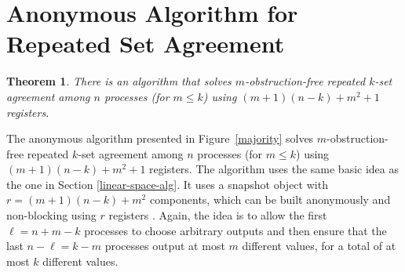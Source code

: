 \documentclass[11pt]{article}
\newtheorem{theorem}{Theorem}
\newtheorem{proposition}[theorem]{Proposition}
\newcommand{\ceil}[1]{\left\lceil #1 \right\rceil}
\newcommand{\ignore}[1]{}
\begin{document}
\ignore{
In the special case where $m=k-1$, the arithmetic in the proof of Theorem \ref{m-conc-lower-thm} can be done more carefully to get a tighter bound, as described in the following proposition, which will be used in Section \ref{resilient-lower}.

\begin{proposition}
Any anonymous algorithm that solves $(k-1)$-obstruction-free $k$-set agreement among $n$ processes using registers must use more than $\sqrt{2(n-k+1)}$ registers.
\end{proposition}
\begin{proof}
Let $m=k-1$.
Assume an algorithm solves the problem using $r$ registers where $r\leq \sqrt{2(n-k+1)}$.
Then,
\begin{eqnarray*}
r -\frac{1}{2} & \leq & \sqrt{2(n-k+1)+\frac{1}{4}}\\
\left(r-\frac{1}{2}\right)^2 & \leq & 2(n-m) + \frac{1}{4}\\
r^2-r & \leq & 2(n-m) \\
n & \geq & m + \frac{r^2-r}{2}\\
n & \geq & \ceil{\frac{k+1}{m}}\left(m+\frac{r^2-r}{2}\right).
\end{eqnarray*}
So, by Lemma \ref{anonymous-gluing} there exists a sequence of $r+1$ registers used in some executions of $A$, 
which is impossible since there are only $r$ registers.
\end{proof}
}


\section{Anonymous Algorithm for
Repeated Set Agreement}
\label{m-conc-alg-sec}
\begin{theorem} 
\label{thm:anon-alg}
There is an algorithm that solves
$m$-obstruction-free repeated $k$-set agreement among $n$ processes (for $m\leq k$)
using $(m+1)(n-k)+m^2+1$ registers.
\end{theorem}

The anonymous algorithm presented in Figure~\ref{majority} solves
$m$-obstruction-free repeated $k$-set agreement among $n$ processes (for $m\leq k$)
using $(m+1)(n-k)+m^2+1$ registers.
The algorithm uses the same basic idea as the one  in Section \ref{linear-space-alg}.
It uses a snapshot object with $r=(m+1)(n-k)+m^2$ components,
which can be built anonymously and non-blocking using $r$ registers \cite{GR07}.
Again, the idea is to allow the first $\ell = n+m-k$ processes
to choose arbitrary outputs and then ensure that the last $n-\ell=k-m$ processes
output at most $m$ different values, for a total of at most $k$ different values.
\end{document}

